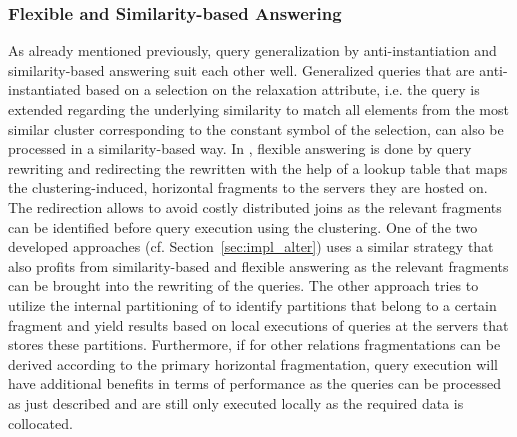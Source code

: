 \subsubsection{Flexible and Similarity-based Answering}
\label{sec:meth_fqa_fqsba}

As already mentioned previously, query generalization by anti-instantiation and similarity-based answering suit each other well. Generalized queries
that are anti-instantiated based on a selection on the relaxation attribute, i.e. the query is extended regarding the underlying similarity to match all
elements from the most similar cluster corresponding to the constant symbol of the selection, can also be processed in a similarity-based way. In
\cite{Wiese2014}, flexible answering is done by query rewriting and redirecting the rewritten with the help of a lookup table that maps the 
clustering-induced, horizontal fragments to the servers they are hosted on. The redirection allows to avoid costly distributed joins as the relevant
fragments can be identified before query execution using the clustering. One of the two developed approaches (cf. Section~\ref{sec:impl_alter}) uses a
similar strategy that also profits from similarity-based and flexible answering as the relevant fragments can be brought into the rewriting of the queries.
The other approach tries to utilize the internal partitioning of  to identify partitions that belong to a certain fragment and yield
results based on local executions of queries at the servers that stores these partitions.
Furthermore, if for other relations fragmentations can be derived according to the primary horizontal fragmentation, query execution will have additional 
benefits in terms of performance as the queries can be processed as just described and are still only executed locally as the required data is collocated.


